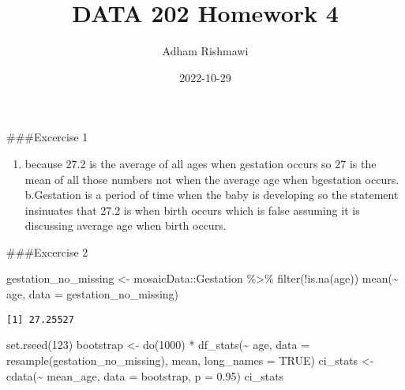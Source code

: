 \documentclass[
]{article}
\title{DATA 202 Homework 4}
\author{Adham Rishmawi}
\date{2022-10-29}
\newenvironment{Shaded}{\begin{snugshade}}{\end{snugshade}}
\newcommand{\AttributeTok}[1]{\textcolor[rgb]{0.77,0.63,0.00}{#1}}
\newcommand{\ConstantTok}[1]{\textcolor[rgb]{0.00,0.00,0.00}{#1}}
\newcommand{\DecValTok}[1]{\textcolor[rgb]{0.00,0.00,0.81}{#1}}
\newcommand{\FloatTok}[1]{\textcolor[rgb]{0.00,0.00,0.81}{#1}}
\newcommand{\FunctionTok}[1]{\textcolor[rgb]{0.00,0.00,0.00}{#1}}
\newcommand{\NormalTok}[1]{#1}
\newcommand{\OtherTok}[1]{\textcolor[rgb]{0.56,0.35,0.01}{#1}}
\newcommand{\SpecialCharTok}[1]{\textcolor[rgb]{0.00,0.00,0.00}{#1}}
\providecommand{\tightlist}{%
  \setlength{\itemsep}{0pt}\setlength{\parskip}{0pt}}
\begin{document}
\maketitle

\#\#\#Excercise 1

\begin{enumerate}
\def\labelenumi{\alph{enumi}.}
\tightlist
\item
  because 27.2 is the average of all ages when gestation occurs so 27 is
  the mean of all those numbers not when the average age when bgestation
  occurs. b.Gestation is a period of time when the baby is developing so
  the statement insinuates that 27.2 is when birth occurs which is false
  assuming it is discussing average age when birth occurs.
\end{enumerate}

\#\#\#Excercise 2

\begin{Shaded}
\begin{Highlighting}[]
\NormalTok{gestation\_no\_missing }\OtherTok{\textless{}{-}}\NormalTok{ mosaicData}\SpecialCharTok{::}\NormalTok{Gestation }\SpecialCharTok{\%\textgreater{}\%} \FunctionTok{filter}\NormalTok{(}\SpecialCharTok{!}\FunctionTok{is.na}\NormalTok{(age))}
\FunctionTok{mean}\NormalTok{(}\SpecialCharTok{\textasciitilde{}}\NormalTok{ age, }\AttributeTok{data =}\NormalTok{ gestation\_no\_missing)}
\end{Highlighting}
\end{Shaded}

\begin{verbatim}
[1] 27.25527
\end{verbatim}

\begin{Shaded}
\begin{Highlighting}[]
\FunctionTok{set.rseed}\NormalTok{(}\DecValTok{123}\NormalTok{)}
\NormalTok{bootstrap }\OtherTok{\textless{}{-}}
  \FunctionTok{do}\NormalTok{(}\DecValTok{1000}\NormalTok{) }\SpecialCharTok{*} \FunctionTok{df\_stats}\NormalTok{(}\SpecialCharTok{\textasciitilde{}}\NormalTok{ age, }\AttributeTok{data =} \FunctionTok{resample}\NormalTok{(gestation\_no\_missing),}
\NormalTok{                      mean, }\AttributeTok{long\_names =} \ConstantTok{TRUE}\NormalTok{)}
\NormalTok{ci\_stats }\OtherTok{\textless{}{-}} \FunctionTok{cdata}\NormalTok{(}\SpecialCharTok{\textasciitilde{}}\NormalTok{ mean\_age, }\AttributeTok{data =}\NormalTok{ bootstrap, }\AttributeTok{p =} \FloatTok{0.95}\NormalTok{)}
\NormalTok{ci\_stats}
\end{Highlighting}
\end{Shaded}
\end{document}
